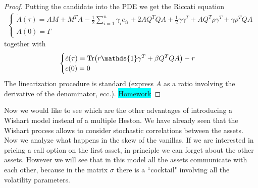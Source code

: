 \begin{proof}
    Putting the candidate into the PDE we get the Riccati equation
    \begin{align*}
        \begin{cases}
            \dot{A}(\tau) = AM + M^TA - \frac{1}{2}\sum_{i=1}^n \gamma_ie_{ii}+ 2AQ^TQA + \frac{1}{2}\gamma\gamma^T + AQ^T\rho\gamma^T + \gamma\rho^TQA \\
            A(0) = \Gamma
        \end{cases}
    \end{align*}
    together with
    \begin{align*}
        \begin{cases}
            \dot{c}(\tau) = \Tr(r\mathds{1}\gamma^T + \beta Q^TQA) - r \\
            c(0) = 0
        \end{cases}
    \end{align*}
    The linearization procedure is standard (express $A$ as a ratio involving the derivative of the denominator, ecc.). \colorbox{cyan}{Homework}
\end{proof}
Now we would like to see which are the other advantages of introducing a Wishart model instead of a multiple Heston. We have already seen that the Wishart process allows to consider stochastic correlations between the assets. Now we analyze what happens in the skew of the vanillas. If we are interested in pricing a call option on the first asset, in principle we can forget about the other assets. However we will see that in this model all the assets communicate with each other, because in the matrix $\sigma$ there is a ``cocktail" involving all the volatility parameters.


